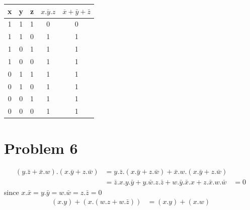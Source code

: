\documentclass[12pt]{article}
\begin{document}
\begin{center}
    \begin{tabular}{ |c|c|c||c|c| }
        x & y & z & $\overline{x.y.z}$ & $\overline{x}+\bar{y}+\bar{z}$\\
        \hline
        1 & 1 & 1 & 0 & 0\\
        \hline
        1 & 1 & 0 & 1 & 1\\
        \hline
        1 & 0 & 1 & 1 & 1\\
        \hline
        1 & 0 & 0 & 1 & 1\\
        \hline
        0 & 1 & 1 & 1 & 1\\
        \hline
        0 & 1 & 0 & 1 & 1\\
        \hline
        0 & 0 & 1 & 1 & 1\\
        \hline
        0 & 0 & 0 & 1 & 1\\
        \hline
    \end{tabular}
\end{center}
\section*{Problem 6}
\begin{align*}
    (y.\bar{z}+\bar{x}.w).(x.\bar{y}+z.\bar{w})&=y.\bar{z}.(x.\bar{y}+z.\bar{w})+\bar{x}.w.(x.\bar{y}+z.\bar{w})\\
    &=\bar{z}.x.y.\bar{y}+y.\bar{w}.z.\bar{z}+w.\bar{y}.\bar{x}.x+z.\bar{x}.w.\bar{w}
    &=\boxed{0}
\end{align*}
since $x.\bar{x}=y.\bar{y}=w.\bar{w}=z.\bar{z}=0$
\begin{align*}
    (x.y)+(x.(w.z+w.\bar{z}))&=\boxed{(x.y)+(x.w)}
\end{align*}
\end{document}
